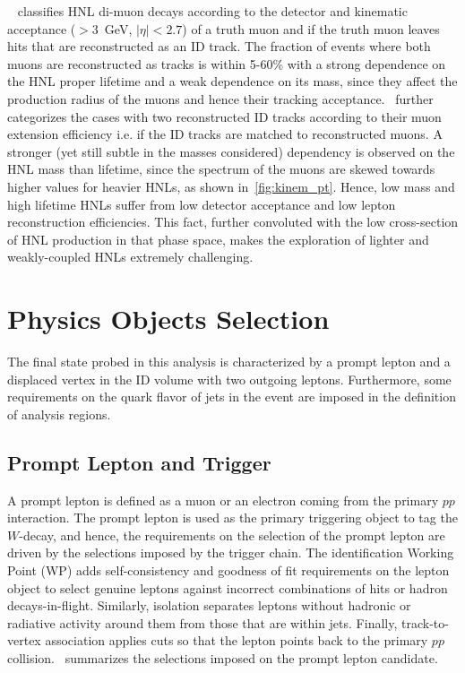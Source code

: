 ~ classifies HNL di-muon decays according to the detector and kinematic acceptance (\pT$>3$~GeV, $|\eta|<2.7$) of a truth muon and if the truth muon leaves hits that are reconstructed as an ID track. The fraction of events where both muons are reconstructed as tracks is within 5-60\% with a strong dependence on the HNL proper lifetime and a weak dependence on its mass, since they affect the production radius of the muons and hence their tracking acceptance.~ further categorizes the cases with two reconstructed ID tracks according to their muon extension efficiency i.e. if the ID tracks are matched to reconstructed muons. A stronger (yet still subtle in the masses considered) dependency is observed on the HNL mass than lifetime, since the \pT spectrum of the muons are skewed towards higher values for heavier HNLs, as shown in~\cref{fig:kinem_pt}. Hence, low mass and high lifetime HNLs suffer from low detector acceptance and low lepton reconstruction efficiencies. This fact, further convoluted with the low cross-section of HNL production in that phase space, makes the exploration of lighter and weakly-coupled HNLs extremely challenging.

\section{Physics Objects Selection}\label{sec:object_sel}
The final state probed in this analysis is characterized by a prompt lepton and a displaced vertex in the ID volume with two outgoing leptons. Furthermore, some requirements on the quark flavor of jets in the event are imposed in the definition of analysis regions.

\subsection{Prompt Lepton and Trigger}
A prompt lepton is defined as a muon or an electron coming from the primary $pp$ interaction. The prompt lepton is used as the primary triggering object to tag the $W$-decay, and hence, the requirements on the selection of the prompt lepton are driven by the selections imposed by the trigger chain. The identification Working Point (WP) adds self-consistency and goodness of fit requirements on the lepton object to select genuine leptons against incorrect combinations of hits or hadron decays-in-flight. Similarly, isolation separates leptons without hadronic or radiative activity around them from those that are within jets. Finally, track-to-vertex association applies cuts so that the lepton points back to the primary $pp$ collision.~ summarizes the selections imposed on the prompt lepton candidate.

